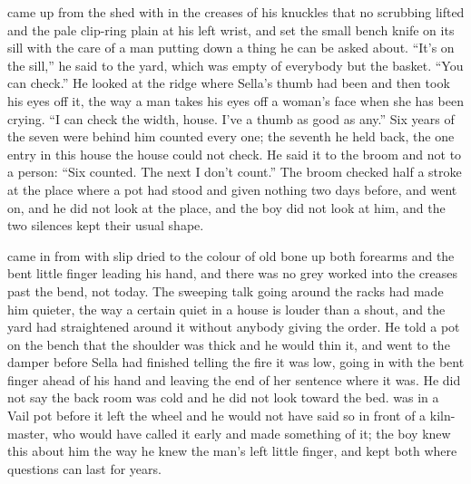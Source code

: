  came up from the shed with  in the creases of his knuckles that no scrubbing lifted and the pale clip-ring plain at his left wrist, and set the small bench knife on its sill with the care of a man putting down a thing he can be asked about. “It's on the sill,” he said to the yard, which was empty of everybody but the basket. “You can check.” He looked at the ridge where Sella's thumb had been and then took his eyes off it, the way a man takes his eyes off a woman's face when she has been crying. “I can check the width, house. I've a thumb as good as any.” Six years of the seven were behind him counted every one; the seventh he held back, the one entry in this house the house could not check. He said it to the broom and not to a person: “Six counted. The next I don't count.” The broom checked half a stroke at the place where a pot had stood and given nothing two days before, and went on, and he did not look at the place, and the boy did not look at him, and the two silences kept their usual shape.

 came in from  with slip dried to the colour of old bone up both forearms and the bent little finger leading his hand, and there was no grey worked into the creases past the bend, not today. The sweeping talk going around the racks had made him quieter, the way a certain quiet in a house is louder than a shout, and the yard had straightened around it without anybody giving the order. He told a pot on the bench that the shoulder was thick and he would thin it, and went to the damper before Sella had finished telling the fire it was low, going in with the bent finger ahead of his hand and leaving the end of her sentence where it was. He did not say the back room was cold and he did not look toward the bed.  was in a Vail pot before it left the wheel and he would not have said so in front of a kiln-master, who would have called it early and made something of it; the boy knew this about him the way he knew the man's left little finger, and kept both where questions can last for years.

